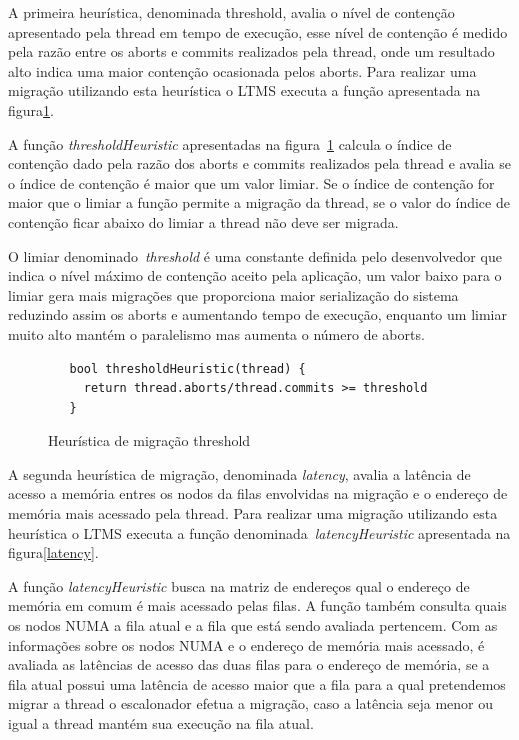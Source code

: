 \documentclass[diss,capa]{texufpel}
\begin{document}
A primeira heurística, denominada threshold, avalia o nível de contenção apresentado pela thread em tempo de execução, esse nível de contenção é medido pela razão entre os aborts e commits realizados pela thread, onde um resultado alto indica uma maior contenção ocasionada pelos aborts. Para realizar uma migração utilizando esta heurística o LTMS executa a função apresentada na figura\ref{threshold}.

A função \emph{thresholdHeuristic} apresentadas na figura~\ref{threshold} calcula o índice de contenção dado pela razão dos aborts e commits realizados pela thread e avalia se o índice de contenção é maior que um valor limiar. Se o índice de contenção for maior que o limiar a função permite a migração da thread, se o valor do índice de contenção ficar abaixo do limiar a thread não deve ser migrada.

O limiar denominado~\emph{threshold} é uma constante definida pelo desenvolvedor que indica o nível máximo de contenção aceito pela aplicação, um valor baixo para o limiar gera mais migrações que proporciona maior serialização do sistema reduzindo assim os aborts e aumentando tempo de execução, enquanto um limiar muito alto mantém o paralelismo mas aumenta o número de aborts.

\begin{figure}[htbp]
 \centering
 \begin{lstlisting}
   bool thresholdHeuristic(thread) {
     return thread.aborts/thread.commits >= threshold
   }
 \end{lstlisting}
 \caption{Heurística de migração threshold}
 \label{threshold}
\end{figure}

A segunda heurística de migração, denominada \emph{latency}, avalia a latência de acesso a memória entres os nodos da filas envolvidas na migração e o endereço de memória mais acessado pela thread. Para realizar uma migração utilizando esta heurística o LTMS executa a função denominada~\emph{latencyHeuristic} apresentada na figura\ref{latency}.

A função \emph{latencyHeuristic} busca na matriz de endereços qual o endereço de memória em comum é mais acessado pelas filas. A função também consulta quais os nodos NUMA a fila atual e a fila que está sendo avaliada pertencem. Com as informações sobre os nodos NUMA e o endereço de memória mais acessado, é avaliada as latências de acesso das duas filas para o endereço de memória, se a fila atual possui uma latência de acesso maior que a fila para a qual pretendemos migrar a thread o escalonador efetua a migração, caso a latência seja menor ou igual a thread mantém sua execução na fila atual.
\end{document}
